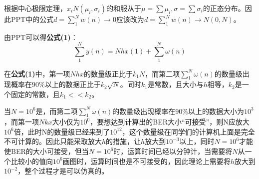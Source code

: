\documentclass[UTF8,a4paper,12pt]{ctexart}
\begin{document}
根据中心极限定理，$x_i$\~{$N(\mu_i,\sigma_i)$}的和服从于$\mu=\sum \mu _i, \sigma = \sum \sigma _i$的正态分布。因此PPT中的公式$d=\sum^N_1 w(n)\to 0$应该改为$d=\sum^N_1 w(n)\to N(0,N)$。

由PPT可以得\textbf{公式(1)}：
\begin{equation}
\sum^N_1 y(n) = Nhx(1)+\sum^N_1 \omega(n)
\end{equation}

在\textbf{公式(1)}中，第一项$Nhx$的数量级正比于$k_1N$，而第二项$\sum^N_1 \omega(n)$的数量级出现概率在$90\%$以上的数据正比于$k_2\sqrt{N}$。同时$k_1$是常数，且大小与$h$相等，$k_2$是一个固定的常数，且$k_1<<k_2$。

当$N=10^6$是，而第二项$\sum^N_1 \omega(n)$的数量级出现概率在$90\%$以上的数据大小为$10^3$，而第一项$Nkx$大小仅为$10^0$，要想达到计算出的BER大小“可接受”，则N应放大$10^6$倍，此时N的数量级已经来到了$10^{12}$，这个数量级在同学们的计算机上面是完全不可计算的。因此只能采取放大$h$的措施，让$h$放大到$10^{-3}$以上，同时$N=10^6$才能使BER的大小可接受，但当$N=10^6$时，运算时间已经以分钟计，当需要将$N$从一个比较小的值向$10^6$画图时，运算时间也是不可接受的，因此理论上需要将$h$放大到$10^{-2}$，整个过程才是可以仿真的。
\end{document}
